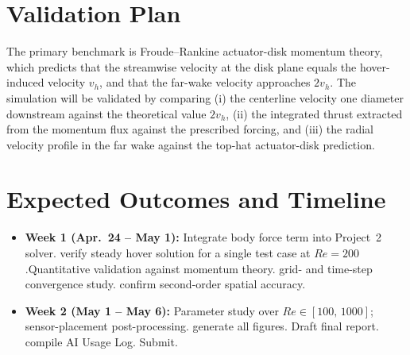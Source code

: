 \documentclass[
  aapm,
  amsmath,amssymb,
  reprint,          %
  floatfix
]{revtex4-2}
\begin{document}
\section{Validation Plan}

The primary benchmark is Froude--Rankine actuator-disk momentum theory, which predicts
that the streamwise velocity at the disk plane equals the hover-induced velocity
$v_{h}$, and that the far-wake velocity approaches $2v_{h}$.
The simulation will be validated by comparing (i) the centerline
velocity one diameter downstream against the theoretical value $2v_{h}$,
(ii) the integrated thrust extracted from the momentum flux against the prescribed
forcing, and (iii) the radial velocity profile in the far wake against the
top-hat actuator-disk prediction.

\section{Expected Outcomes and Timeline}

\begin{itemize}
  \item \textbf{Week 1 (Apr.\ 24 -- May 1):}
    Integrate body force term into Project~2 solver. verify steady hover solution
    for a single test case at $Re = 200$.Quantitative validation against momentum theory. grid- and time-step convergence
    study. confirm second-order spatial accuracy.
  \item \textbf{Week 2 (May 1 -- May 6):}
    Parameter study over $Re \in [100,\,1000]$; sensor-placement post-processing.
    generate all figures. Draft final report. compile AI Usage Log. Submit.
\end{itemize}




\end{document}
